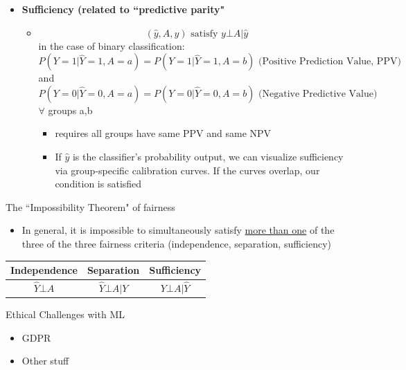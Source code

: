\documentclass[10pt, oneside]{article}
\begin{document}
\begin{itemize}
\begin{itemize}
\begin{itemize}
        \end{itemize}
        \item \textbf{Sufficiency (related to ``predictive parity"}
        \begin{itemize}
            \item \[(\hat y, A, y) \text{ satisfy } y\bot A|\hat y\]in the case of binary classification:\[P(Y=1| \hat Y = 1, A=a) = P(Y=1|\hat Y=1, A=b) \text{ (Positive Prediction Value, PPV)}\] and 
            \[P(Y=0| \hat Y = 0, A=a) = P(Y=0|\hat Y=0, A=b) \text{ (Negative Predictive Value)}\]$\forall$ groups a,b
            \begin{itemize}
                \item requires all groups have same PPV and same NPV
                \item If $\hat y$ is the classifier's probability output, we can visualize sufficiency via group-specific calibration curves. If the curves overlap, our condition is satisfied
            \end{itemize}
        \end{itemize}
    \end{itemize}
\end{itemize}
The ``Impossibility Theorem" of fairness
\begin{itemize}
    \item In general, it is impossible to simultaneously satisfy \underline{more than one} of the three of the three fairness criteria (independence, separation, sufficiency)
\end{itemize}
\begin{center}
    \begin{tabular}{|c|c|c|}
        \hline
        Independence & Separation & Sufficiency \\
        \hline
        $\hat Y \bot A$ &$\hat Y \bot A | Y$ &$Y\bot A|\hat Y$\\
        \hline
    \end{tabular}
\end{center}
Ethical Challenges with ML
\begin{itemize}
    \item GDPR
    \item Other stuff
\end{itemize}
\end{document}
